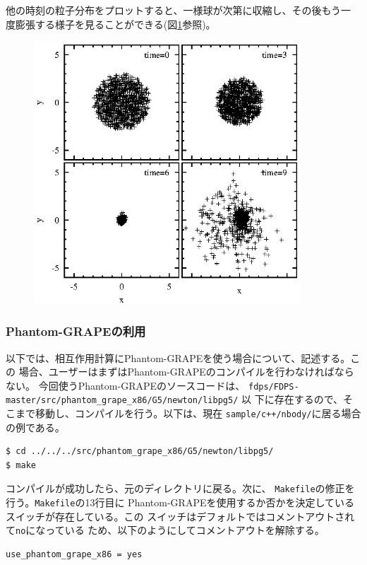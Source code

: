 \documentclass[12pt,a4paper,dvipdfmx]{jarticle}
\begin{document}
他の時刻の粒子分布をプロットすると、一様球が次第に収縮し、その後もう一
度膨張する様子を見ることができる(図\ref{fig:nbody}参照)。

\begin{figure}
  \begin{center}
        \includegraphics[width=10cm,bb=0 0 220 220]{fig/nbody.eps}
  \end{center}
  \caption{}
  \label{fig:nbody}
\end{figure}

\subsubsection{Phantom-GRAPEの利用}

以下では、相互作用計算にPhantom-GRAPEを使う場合について、記述する。この
場合、ユーザーはまずはPhantom-GRAPEのコンパイルを行わなければならない。
今回使うPhantom-GRAPEのソースコードは、
\texttt{fdps/FDPS-master/src/phantom\_grape\_x86/G5/newton/libpg5/} 以
下に存在するので、そこまで移動し、コンパイルを行う。以下は、現在
\texttt{sample/c++/nbody/}に居る場合の例である。
\begin{screen}
\begin{verbatim}
$ cd ../../../src/phantom_grape_x86/G5/newton/libpg5/
$ make
\end{verbatim}
\end{screen}

コンパイルが成功したら、元のディレクトリに戻る。次に、
\texttt{Makefile}の修正を行う。\texttt{Makefile}の13行目に
Phantom-GRAPEを使用するか否かを決定しているスイッチが存在している。この
スイッチはデフォルトではコメントアウトされて\texttt{no}になっている
ため、以下のようにしてコメントアウトを解除する。
\begin{screen}
\begin{verbatim}
use_phantom_grape_x86 = yes
\end{verbatim}
\end{screen}
\end{document}
